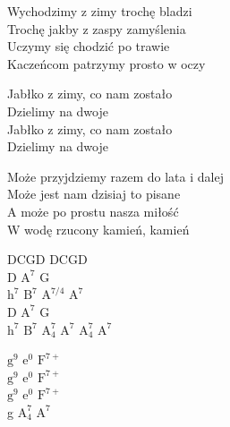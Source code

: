 \begin{textn}
    \chordfill
    Wychodzimy z zimy trochę bladzi\\
    Trochę jakby z zaspy zamyślenia\\
    Uczymy się chodzić po trawie\\
    Kaczeńcom patrzymy prosto w oczy

    \vin Jabłko z zimy, co nam zostało\\
    \vin Dzielimy na dwoje\\
    \vin Jabłko z zimy, co nam zostało\\
    \vin Dzielimy na dwoje

    Może przyjdziemy razem do lata i dalej\\
    Może jest nam dzisiaj to pisane\\
    A może po prostu nasza miłość\\
    W wodę rzucony kamień, kamień
\end{textn}
\begin{chordw}
    DCGD DCGD\\
    D $\mathrm{A^7}$ G\\
    $\mathrm{h^7}$ $\mathrm{B^7}$ $\mathrm{A^{7/4}}$ $\mathrm{A^7}$\\
    D $\mathrm{A^7}$ G\\
    $\mathrm{h^7}$ $\mathrm{B^7}$ $\mathrm{A_4^7}$ $\mathrm{A^7}$ $\mathrm{A_4^7}$ $\mathrm{A^7}$

    $\mathrm{g^9}$ $\mathrm{e^0}$ $\mathrm{F^{7+}}$\\
    $\mathrm{g^9}$ $\mathrm{e^0}$ $\mathrm{F^{7+}}$\\
    $\mathrm{g^9}$ $\mathrm{e^0}$ $\mathrm{F^{7+}}$\\
    g $\mathrm{A_4^7}$ $\mathrm{A^7}$
\end{chordw}
